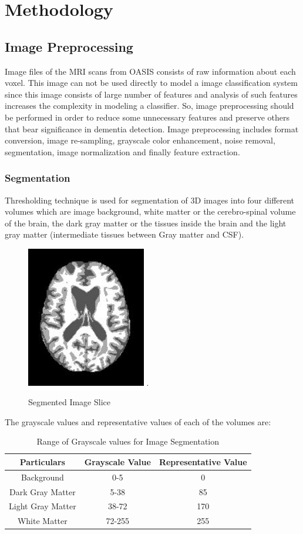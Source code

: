\documentclass[journal,twoside]{IEEEtran}
\begin{document}
\section{Methodology}
\subsection{Image Preprocessing}
Image files of the MRI scans from OASIS consists of raw information about each voxel. This image can not be used directly to model a image classification system since this image consists of large number of features and analysis of such features increases the complexity in modeling a classifier. So, image preprocessing should be performed in order to reduce some unnecessary features and preserve others that bear significance in dementia detection. Image preprocessing includes format conversion, image re-sampling, grayscale color enhancement, noise removal, segmentation, image normalization and finally feature extraction.\newline
\subsubsection{Segmentation}
Thresholding technique is used for segmentation of 3D images into four different volumes which are image background, white matter or the cerebro-spinal volume of the brain, the dark gray matter or the tissues inside the brain and the light gray matter (intermediate tissues between Gray matter and CSF).
\begin{figure}[h]
\centering
\includegraphics[width=2.05in]{9.jpg}
\DeclareGraphicsExtensions.
\caption{Segmented Image Slice}
\end{figure}
\newline The grayscale values and representative values of each of the volumes are:
\begin{table}[h]
\centering
\begin{tabular}{|c|c|c|}
	\hline
	Particulars & Grayscale Value & Representative Value\\
	\hline
	Background & 0-5 & 0\\
	Dark Gray Matter &  5-38 & 85\\
	Light Gray Matter  & 38-72 & 170\\
	White Matter & 72-255 & 255\\
	\hline
\end{tabular}
\caption{Range of Grayscale values for Image Segmentation}
\end{table}
\newline
\end{document}
